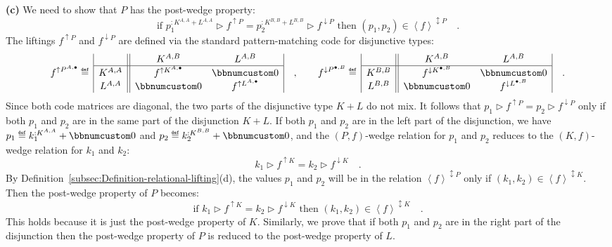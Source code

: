 \textbf{(c)} We need to show that $P$ has the post-wedge property:
\[
\text{if }p_{1}^{:K^{A,A}+L^{A,A}}\triangleright f^{\uparrow P}=p_{2}^{:K^{B,B}+L^{B,B}}\triangleright f^{\downarrow P}\text{ then }(p_{1},p_{2})\in\left<f\right>^{\updownarrow P}\quad.
\]
The liftings $f^{\uparrow P}$ and $f^{\downarrow P}$ are defined
via the standard pattern-matching code for disjunctive types:
\[
f^{\uparrow P^{A,\bullet}}\triangleq\,\begin{array}{|c||cc|}
 & K^{A,B} & L^{A,B}\\
\hline K^{A,A} & f^{\uparrow K^{A,\bullet}} & \bbnum 0\\
L^{A,A} & \bbnum 0 & f^{\uparrow L^{A,\bullet}}
\end{array}\quad,\quad\quad f^{\downarrow P^{\bullet,B}}\triangleq\,\begin{array}{|c||cc|}
 & K^{A,B} & L^{A,B}\\
\hline K^{B,B} & f^{\downarrow K^{\bullet,B}} & \bbnum 0\\
L^{B,B} & \bbnum 0 & f^{\downarrow L^{\bullet,B}}
\end{array}\quad.
\]
Since both code matrices are diagonal, the two parts of the disjunctive
type $K+L$ do not mix. It follows that $p_{1}\triangleright f^{\uparrow P}=p_{2}\triangleright f^{\downarrow P}$
only if both $p_{1}$ and $p_{2}$ are in the same part of the disjunction
$K+L$. If both $p_{1}$ and $p_{2}$ are in the left part of the
disjunction, we have $p_{1}\triangleq k_{1}^{:K^{A,A}}+\bbnum 0$
and $p_{2}\triangleq k_{2}^{:K^{B,B}}+\bbnum 0$, and the $\left(P,f\right)$-wedge
relation for $p_{1}$ and $p_{2}$ reduces to the $\left(K,f\right)$-wedge
relation for $k_{1}$ and $k_{2}$:
\[
k_{1}\triangleright f^{\uparrow K}=k_{2}\triangleright f^{\downarrow K}\quad.
\]
By Definition~\ref{subsec:Definition-relational-lifting}(d), the
values $p_{1}$ and $p_{2}$ will be in the relation $\left<f\right>^{\updownarrow P}$
only if $(k_{1},k_{2})\in\left<f\right>^{\updownarrow K}$. Then the
post-wedge property of $P$ becomes:
\[
\text{if }k_{1}\triangleright f^{\uparrow K}=k_{2}\triangleright f^{\downarrow K}\text{ then }(k_{1},k_{2})\in\left<f\right>^{\updownarrow K}\quad.
\]
This holds because it is just the post-wedge property of $K$. Similarly,
we prove that if both $p_{1}$ and $p_{2}$ are in the right part
of the disjunction then the post-wedge property of $P$ is reduced
to the post-wedge property of $L$.

